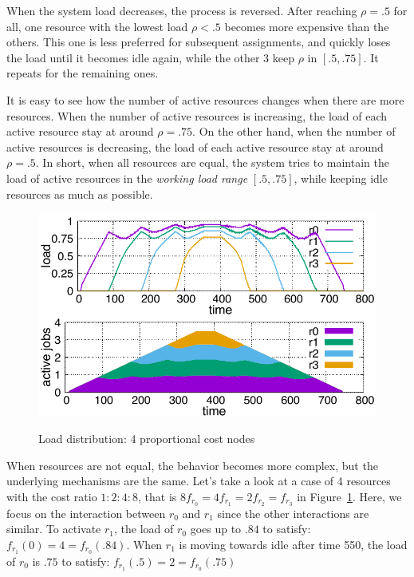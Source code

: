 When the system load decreases, the process is reversed.
After reaching $\rho = .5$ for all,
one resource with the lowest load $\rho < .5$ becomes more expensive
than the others.
This one is less preferred for subsequent assignments, and quickly
loses the load until it becomes idle again, while the other 3 keep
$\rho$ in $[.5, .75]$. It repeats for the remaining ones.

It is easy to see how the number of active resources changes when
there are more resources.
When the number of active resources is increasing, the load of each
active resource stay at around $\rho = .75$.
On the other hand, when the number of active resources is decreasing,
the load of each active resource stay at around $\rho = .5$.
In short, when all resources are equal, the system tries to maintain
the load of active resources in the {\em working load range}
$[.5, .75]$, while keeping idle resources as much as possible.

\begin{figure}
  \begin{center}
    \includegraphics[width=1.0\columnwidth]{4node-ratio.pdf}
    \vspace{-2.0ex}
    \caption{Load distribution: 4 proportional cost nodes}
    \label{fig:4node-ratio}
  \end{center}
\end{figure}

When resources are not equal, the behavior becomes more complex, but
the underlying mechanisms are the same.
Let's take a look at a case of 4 resources with the cost ratio $1:2:4:8$,
that is $8 f_{r_{0}} = 4 f_{r_{1}} = 2 f_{r_{2}} = f_{r_{3}}$ in
Figure~\ref{fig:4node-ratio}.
Here, we focus on the interaction between $r_{0}$ and $r_{1}$ since
the other interactions are similar.
To activate $r_{1}$, the load of $r_{0}$ goes up to $.84$ to satisfy:
$f_{r_{1}}(0) = 4 = f_{r_{0}}(.84)$.
When $r_{1}$ is moving towards idle after time 550, the load
of $r_{0}$ is $.75$ to satisfy: $f_{r_{1}}(.5) = 2 = f_{r_{0}}(.75)$


